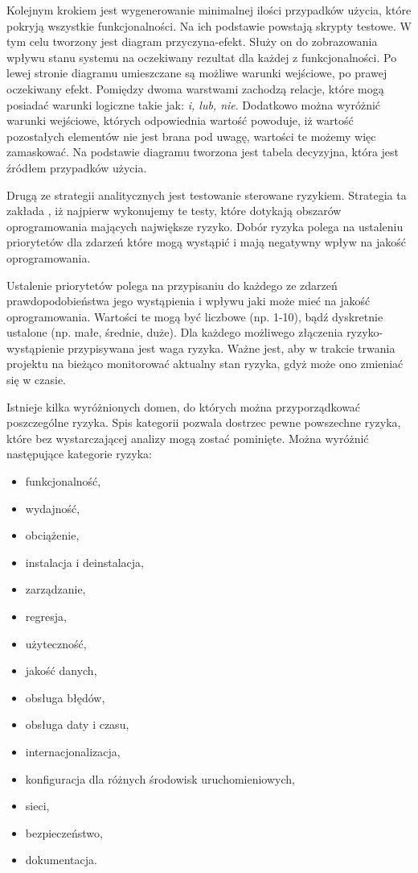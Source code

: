 Kolejnym krokiem jest wygenerowanie minimalnej ilości przypadków użycia, które pokryją wszystkie funkcjonalności. Na ich podstawie powstają skrypty testowe. W tym celu tworzony jest diagram przyczyna-efekt. Służy on do zobrazowania wpływu stanu systemu na oczekiwany rezultat dla każdej z funkcjonalności. Po lewej stronie diagramu umieszczane są możliwe warunki wejściowe, po prawej oczekiwany efekt. Pomiędzy dwoma warstwami zachodzą relacje, które mogą posiadać warunki logiczne takie jak: \textit{i, lub, nie}. Dodatkowo można wyróżnić warunki wejściowe, których odpowiednia wartość powoduje, iż wartość pozostałych elementów nie jest brana pod uwagę, wartości te możemy więc zamaskować. Na podstawie diagramu tworzona jest tabela decyzyjna, która jest źródłem przypadków użycia.

Drugą ze strategii analitycznych jest testowanie sterowane ryzykiem. Strategia ta zakłada , iż najpierw wykonujemy te testy, które dotykają obszarów oprogramowania mających największe ryzyko.  Dobór ryzyka polega na ustaleniu priorytetów dla zdarzeń które mogą wystąpić i mają negatywny wpływ na jakość oprogramowania.

Ustalenie priorytetów polega na przypisaniu do każdego ze zdarzeń prawdopodobieństwa jego wystąpienia i wpływu jaki może mieć na jakość oprogramowania. Wartości te mogą być liczbowe (np. 1-10), bądź dyskretnie ustalone (np. małe, średnie, duże). Dla każdego możliwego złączenia ryzyko-wystąpienie przypisywana jest waga ryzyka. Ważne jest, aby w trakcie trwania projektu na bieżąco monitorować aktualny stan ryzyka, gdyż może ono zmieniać się w czasie.

Istnieje kilka wyróżnionych domen, do których można przyporządkować poszczególne ryzyka. Spis kategorii pozwala dostrzec pewne powszechne ryzyka, które bez wystarczającej analizy mogą zostać pominięte. Można wyróżnić następujące kategorie ryzyka:

\begin{itemize}
  \item funkcjonalność,
  \item wydajność,
  \item obciążenie,
  \item instalacja i deinstalacja,
  \item zarządzanie,
  \item regresja,
  \item użyteczność,
  \item jakość danych,
  \item obsługa błędów,
  \item obsługa daty i czasu,
  \item internacjonalizacja,
  \item konfiguracja dla różnych środowisk uruchomieniowych,
  \item sieci,
  \item bezpieczeństwo,
  \item dokumentacja.
\end{itemize}

